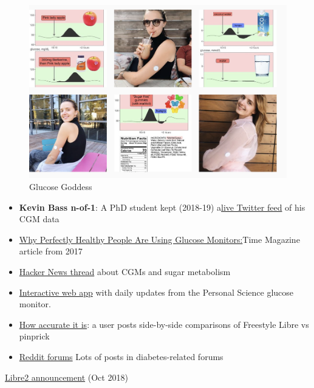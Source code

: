 \documentclass[
]{book}
\providecommand{\tightlist}{%
  \setlength{\itemsep}{0pt}\setlength{\parskip}{0pt}}
\begin{document}
\begin{figure}
\centering
\includegraphics{images/glucose-goddess.png}
\caption{Glucose Goddess}
\end{figure}

\begin{itemize}
\tightlist
\item
  \textbf{Kevin Bass n-of-1}: A PhD student kept (2018-19) a\href{https://twitter.com/kevinstrials}{live Twitter feed} of his CGM data
\item
  \href{http://time.com/4703099/continuous-glucose-monitor-blood-sugar-diabetes/}{Why Perfectly Healthy People Are Using Glucose Monitors:}Time Magazine article from 2017
\item
  \href{https://news.ycombinator.com/item?id=15521882\#15522046}{Hacker News thread} about CGMs and sugar metabolism
\item
  \href{https://personalscience.shinyapps.io/librelink/}{Interactive web app} with daily updates from the Personal Science glucose monitor.
\item
  \href{https://imgur.com/a/2xNEgGA}{How accurate it is}: a user posts side-by-side comparisons of Freestyle Libre vs pinprick
\item
  \href{https://www.reddit.com/search?q=freestyle\%20libre}{Reddit forums} Lots of posts in diabetes-related forums
\end{itemize}

\href{http://abbott.mediaroom.com/2018-10-01-Abbott-s-FreeStyle-R-Libre-2-with-Optional-Real-Time-Alarms-Secures-CE-Mark-for-Use-in-Europe?fbclid=IwAR3B9sMnnUa44Aor42ctKUyAuUuG1ZLly3pnanVAAolX1PF6HRCV4SBaOyo}{Libre2 announcement} (Oct 2018)
\end{document}

